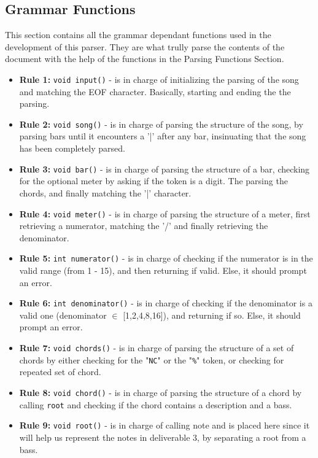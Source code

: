 \documentclass{article}
\begin{document}
\subsection{Grammar Functions}
This section contains all the grammar dependant functions used in the development of this parser. They are what trully parse the contents of the document with the help of the functions in the Parsing Functions Section.
\begin{itemize}
    \item \textbf{Rule 1:} \texttt{void input()} - is in charge of initializing the parsing of the song and matching the EOF character. Basically, starting and ending the the parsing.
    \item \textbf{Rule 2:} \texttt{void song()} - is in charge of parsing the structure of the song, by parsing bars until it encounters a '|' after any bar, insinuating that the song has been completely parsed.
    \item \textbf{Rule 3:} \texttt{void bar()} - is in charge of parsing the structure of a bar, checking for the optional meter by asking if the token is a digit. The parsing the chords, and finally matching the '|' character.
    \item \textbf{Rule 4:} \texttt{void meter()} - is in charge of parsing the structure of a meter, first retrieving a numerator, matching the '/' and finally retrieving the denominator.
    \item \textbf{Rule 5:} \texttt{int numerator()} - is in charge of checking if the numerator is in the valid range (from 1 - 15), and then returning if valid. Else, it should prompt an error. 
    \item \textbf{Rule 6:} \texttt{int denominator()} - is in charge of checking if the denominator is a valid one (denominator $\in$ [1,2,4,8,16]), and returning if so. Else, it should prompt an error.
    \item \textbf{Rule 7:} \texttt{void chords()} - is in charge of parsing the structure of a set of chords by either checking for the "\texttt{NC}" or the "\texttt{\%}" token, or checking for repeated set of chord. 
    \item \textbf{Rule 8:} \texttt{void chord()} - is in charge of parsing the structure of a chord by calling \texttt{root} and checking if the chord contains a description and a bass.
    \item \textbf{Rule 9:} \texttt{void root()} - is in charge of calling note and is placed here since it will help us represent the notes in deliverable 3, by separating a root from a bass.

\end{itemize}
\end{document}
